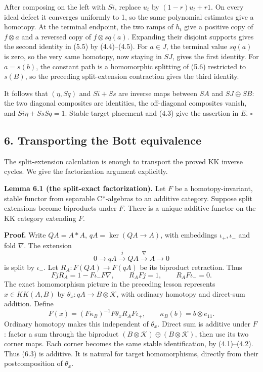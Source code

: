 \documentclass[
  11pt,
]{article}
\begin{document}
After composing on the left with \(Si\), replace \(u_t\) by
\((1-r)u_t+r1\). On every ideal defect it converges uniformly to 1, so
the same polynomial estimates give a homotopy. At the terminal endpoint,
the two ramps of \(h_t\) give a positive copy of \(f\otimes a\) and a
reversed copy of \(f\otimes sq(a)\). Expanding their disjoint supports
gives the second identity in (5.5) by (4.4)--(4.5). For \(a\in J\), the
terminal value \(sq(a)\) is zero, so the very same homotopy, now staying
in \(SJ\), gives the first identity. For \(a=s(b)\), the constant path
is a homomorphic splitting of (5.6) restricted to \(s(B)\), so the
preceding split-extension contraction gives the third identity.

It follows that \((\eta,Sq)\) and \(Si+Ss\) are inverse maps between
\(SA\) and \(SJ\oplus SB\): the two diagonal composites are identities,
the off-diagonal composites vanish, and \(Si\eta+SsSq=1\). Stable target
placement and (4.3) give the assertion in \(E\). \(\square\)

\subsection{6. Transporting the Bott
equivalence}\label{transporting-the-bott-equivalence}

The split-extension calculation is enough to transport the proved KK
inverse cycles. We give the factorization argument explicitly.

\textbf{Lemma 6.1 (the split-exact factorization).} Let \(F\) be a
homotopy-invariant, stable functor from separable C*-algebras to an
additive category. Suppose split extensions become biproducts under
\(F\). There is a unique additive functor on the KK category extending
\(F\).

\textbf{Proof.} Write \(QA=A*A\), \(qA=\ker(QA\to A)\), with embeddings
\(\iota_+,\iota_-\) and fold \(\nabla\). The extension \[
0\to qA\xrightarrow{j}QA\xrightarrow{\nabla}A\to0
\tag{6.1}
\] is split by \(\iota_-\). Let \(R_A:F(QA)\to F(qA)\) be its biproduct
retraction. Thus \[
FjR_A=1-F\iota_-F\nabla,\qquad R_AFj=1,
\qquad R_AF\iota_-=0.
\tag{6.2}
\] The exact homomorphism picture in the preceding lesson represents
\(x\in KK(A,B)\) by \(\theta_x:qA\to B\otimes\mathcal K\), with ordinary
homotopy and direct-sum addition. Define \[
F(x)=(F\kappa_B)^{-1}F\theta_x R_A F\iota_+,
\qquad\kappa_B(b)=b\otimes e_{11}.
\tag{6.3}
\] Ordinary homotopy makes this independent of \(\theta_x\). Direct sum
is additive under \(F\): factor a sum through the biproduct
\((B\otimes\mathcal K)\oplus(B\otimes\mathcal K)\), then use its two
corner maps. Each corner becomes the same stable identification, by
(4.1)--(4.2). Thus (6.3) is additive. It is natural for target
homomorphisms, directly from their postcomposition of \(\theta_x\).
\end{document}
